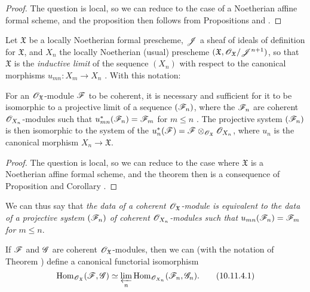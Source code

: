 \begin{proof}
\label{proof-1.10.11.1}
The question is local, so we can reduce to the case of a Noetherian affine formal scheme, and the proposition then follows from Propositions  and .
\end{proof}

\begin{env}[10.11.2]
\label{1.10.11.2}
Let $\mathfrak{X}$ be a locally Noetherian formal prescheme, $\mathscr{J}$ a sheaf of ideals of definition for $\mathfrak{X}$, and $X_n$ the locally Noetherian (usual) prescheme $(\mathfrak{X},\mathscr{O}_\mathfrak{X}/\mathscr{J}^{n+1})$, so that $\mathfrak{X}$ is the \emph{inductive limit} of the sequence $(X_n)$ with respect to the canonical morphisms $u_{mn}:X_m\to X_n$ .
With this notation:
\end{env}

\begin{theorem}[10.11.3]
\label{1.10.11.3}
For an $\mathscr{O}_\mathfrak{X}$-module $\mathscr{F}$ to be coherent, it is necessary and sufficient for it to be isomorphic to a projective limit of a sequence $(\mathscr{F}_n)$, where the $\mathscr{F}_n$ are coherent $\mathscr{O}_{X_n}$-modules such that $u_{mn}^*(\mathscr{F}_n)=\mathscr{F}_m$ for $m\leq n$ .
The projective system $(\mathscr{F}_n)$ is then isomorphic to the system of the $u_n^*(\mathscr{F})=\mathscr{F}\otimes_{\mathscr{O}_\mathfrak{X}}\mathscr{O}_{X_n}$, where $u_n$ is the canonical morphism $X_n\to\mathfrak{X}$.
\end{theorem}

\begin{proof}
\label{proof-1.10.11.3}
The question is local, so we can reduce to the case where $\mathfrak{X}$ is a Noetherian affine formal scheme, and the theorem then is a consequence of Proposition  and Corollary .
\end{proof}

We can thus say that \emph{the data of a coherent $\mathscr{O}_\mathfrak{X}$-module is equivalent to the data of a projective system $(\mathscr{F}_n)$ of coherent $\mathscr{O}_{X_n}$-modules such that $u_{mn}(\mathscr{F}_n)=\mathscr{F}_m$ for $m\leq n$}.

\begin{corollary}[10.11.4]
\label{1.10.11.4}
If $\mathscr{F}$ and $\mathscr{G}$ are coherent $\mathscr{O}_\mathfrak{X}$-modules, then we can (with the notation of Theorem ) define a canonical functorial isomorphism
\[
\label{1.10.11.4.1}
  \operatorname{Hom}_{\mathscr{O}_\mathfrak{X}}(\mathscr{F},\mathscr{G})\simeq\varprojlim_n\operatorname{Hom}_{\mathscr{O}_{X_n}}(\mathscr{F}_n,\mathscr{G}_n).
  \tag{10.11.4.1}
\]
\end{corollary}

